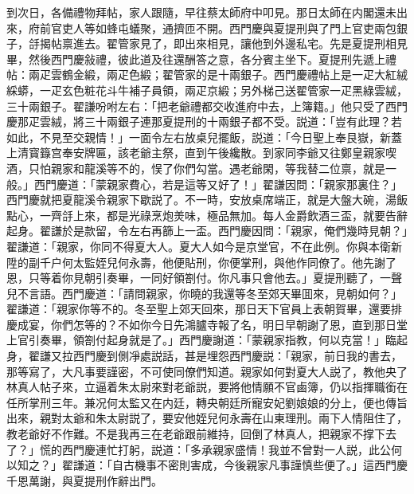 到次日，各備禮物拜帖，家人跟隨，早往蔡太師府中叩見。那日太師在内閣還未出來，府前官吏人等如蜂屯蟻聚，通擠匝不開。西門慶與夏提刑與了門上官吏兩包銀子，㧱揭帖禀進去。翟管家見了，即出來相見，讓他到外邊私宅。先是夏提刑相見畢，然後西門慶敍禮，彼此道及往還酬答之意，各分賓主坐下。夏提刑先遞上禮帖：兩疋雲鶴金緞，兩疋色緞；翟管家的是十兩銀子。西門慶禮帖上是一疋大紅絨綵蟒，一疋玄色粧花斗牛補子員領，兩疋京緞；另外梯己送翟管家一疋黑綠雲絨，三十兩銀子。翟謙吩咐左右：「把老爺禮都交收進府中去，上簿籍。」他只受了西門慶那疋雲絨，將三十兩銀子連那夏提刑的十兩銀子都不受。説道：「豈有此理？若如此，不見至交親情！」一面令左右放桌兒擺飯，説道：「今日聖上奉艮嶽，新蓋上清寳籙宫奉安牌匾，該老爺主祭，直到午後纔散。到家同李爺又往鄭皇親家喫酒，只怕親家和龍溪等不的，悮了你們勾當。遇老爺閑，等我替二位禀，就是一般。」西門慶道：「蒙親家費心，若是這等又好了！」翟謙因問：「親家那裏住？」西門慶就把夏龍溪令親家下歇説了。不一時，安放桌席端正，就是大盤大碗，湯飯點心，一齊㧱上來，都是光祿烹炮羙味，極品無加。每人金爵飲酒三盃，就要告辭起身。翟謙於是款留，令左右再篩上一盃。西門慶因問：「親家，俺們幾時見朝？」翟謙道：「親家，你同不得夏大人。夏大人如今是京堂官，不在此例。你與本衛新陞的副千户何太監姪兒何永壽，他便貼刑，你便掌刑，與他作同僚了。他先謝了恩，只等着你見朝引奏畢，一同好領劄付。你凡事只會他去。」夏提刑聽了，一聲兒不言語。西門慶道：「請問親家，你曉的我還等冬至郊天畢囬來，見朝如何？」翟謙道：「親家你等不的。冬至聖上郊天回來，那日天下官員上表朝賀畢，還要排慶成宴，你們怎等的？不如你今日先鴻臚寺報了名，明日早朝謝了恩，直到那日堂上官引奏畢，領劄付起身就是了。」西門慶謝道：「蒙親家指教，何以克當！」臨起身，翟謙又拉西門慶到側凈處説話，甚是埋怨西門慶説：「親家，前日我的書去，那等寫了，大凡事要謹密，不可使同僚們知道。親家如何對夏大人説了，教他央了林真人帖子來，立逼着朱太尉來對老爺説，要將他情願不官鹵簿，仍以指揮職銜在任所掌刑三年。兼况何太監又在内廷，轉央朝廷所寵安妃劉娘娘的分上，便也傳旨出來，親對太爺和朱太尉説了，要安他姪兒何永壽在山東理刑。兩下人情阻住了，教老爺好不作難。不是我再三在老爺跟前維持，回倒了林真人，把親家不撑下去了？」慌的西門慶連忙打躬，説道：「多承親家盛情！我並不曾對一人説，此公何以知之？」翟謙道：「自古機事不密則害成，今後親家凡事謹慎些便了。」這西門慶千恩萬謝，與夏提刑作辭出門。

